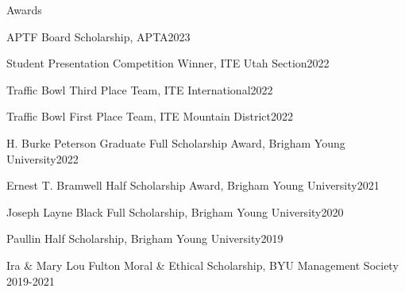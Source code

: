 \documentclass{resume} %
\begin{document}

\begin{rSection}{Awards}
\begin{esSubsection}{APTF Board Scholarship,}{ APTA}{2023}{}{}
\end{esSubsection}
\begin{esSubsection}{Student Presentation Competition Winner,}{ ITE Utah Section}{2022}{}{}
\end{esSubsection}
\begin{esSubsection}{Traffic Bowl Third Place Team,}{ ITE International}{2022}{}{}
\end{esSubsection}
\begin{esSubsection}{Traffic Bowl First Place Team,}{ ITE Mountain District}{2022}{}{}
\end{esSubsection}
\begin{esSubsection}{H. Burke Peterson Graduate Full Scholarship Award,}{ Brigham Young University}{2022}{}{}
\end{esSubsection}
\begin{esSubsection}{Ernest T. Bramwell Half Scholarship Award,}{ Brigham Young University}{2021}{}{}
\end{esSubsection}
\begin{esSubsection}{Joseph Layne Black Full Scholarship,}{ Brigham Young University}{2020}{}{}
\end{esSubsection}
\begin{esSubsection}{Paullin Half Scholarship,}{ Brigham Young University}{2019}{}{}
\end{esSubsection}
\begin{esSubsection}{Ira \& Mary Lou Fulton Moral \& Ethical Scholarship,}{ BYU Management Society}{ 2019-2021}{}{}
\end{esSubsection}
\end{rSection}



\end{document}
